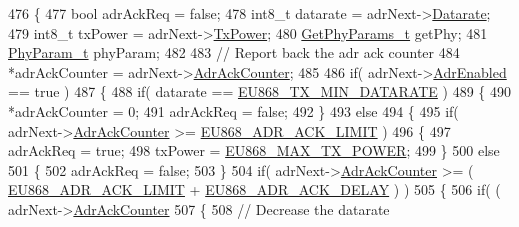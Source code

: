\begin{DoxyCode}
476 \{
477     \textcolor{keywordtype}{bool} adrAckReq = \textcolor{keyword}{false};
478     int8\_t datarate = adrNext->\mbox{\hyperlink{structs_adr_next_params_ae2f6080f3aa0e9485c55513ca56bb24d}{Datarate}};
479     int8\_t txPower = adrNext->\mbox{\hyperlink{structs_adr_next_params_a037b4f849fa8ed4aa1d3c58aef2b28ec}{TxPower}};
480     \mbox{\hyperlink{structs_get_phy_params}{GetPhyParams\_t}} getPhy;
481     \mbox{\hyperlink{unionu_phy_param}{PhyParam\_t}} phyParam;
482 
483     \textcolor{comment}{// Report back the adr ack counter}
484     *adrAckCounter = adrNext->\mbox{\hyperlink{structs_adr_next_params_a24f0356a3491bf07be9ac99ffa33896a}{AdrAckCounter}};
485 
486     \textcolor{keywordflow}{if}( adrNext->\mbox{\hyperlink{structs_adr_next_params_ab3e2fb44577c95786e11aacd56769703}{AdrEnabled}} == \textcolor{keyword}{true} )
487     \{
488         \textcolor{keywordflow}{if}( datarate == \mbox{\hyperlink{group___r_e_g_i_o_n_e_u868_ga2df2a8fc7db7e674c3e58de0dd1c90a4}{EU868\_TX\_MIN\_DATARATE}} )
489         \{
490             *adrAckCounter = 0;
491             adrAckReq = \textcolor{keyword}{false};
492         \}
493         \textcolor{keywordflow}{else}
494         \{
495             \textcolor{keywordflow}{if}( adrNext->\mbox{\hyperlink{structs_adr_next_params_a24f0356a3491bf07be9ac99ffa33896a}{AdrAckCounter}} >= \mbox{\hyperlink{group___r_e_g_i_o_n_e_u868_ga67c54d4a8b30d30138dd013779f72cdf}{EU868\_ADR\_ACK\_LIMIT}} )
496             \{
497                 adrAckReq = \textcolor{keyword}{true};
498                 txPower = \mbox{\hyperlink{group___r_e_g_i_o_n_e_u868_ga39e338c7f8454f594302811f61d9560d}{EU868\_MAX\_TX\_POWER}};
499             \}
500             \textcolor{keywordflow}{else}
501             \{
502                 adrAckReq = \textcolor{keyword}{false};
503             \}
504             \textcolor{keywordflow}{if}( adrNext->\mbox{\hyperlink{structs_adr_next_params_a24f0356a3491bf07be9ac99ffa33896a}{AdrAckCounter}} >= ( \mbox{\hyperlink{group___r_e_g_i_o_n_e_u868_ga67c54d4a8b30d30138dd013779f72cdf}{EU868\_ADR\_ACK\_LIMIT}} + 
      \mbox{\hyperlink{group___r_e_g_i_o_n_e_u868_ga13b5d7d3346971d4dda9919ed73b1394}{EU868\_ADR\_ACK\_DELAY}} ) )
505             \{
506                 \textcolor{keywordflow}{if}( ( adrNext->\mbox{\hyperlink{structs_adr_next_params_a24f0356a3491bf07be9ac99ffa33896a}{AdrAckCounter}} %
507                 \{
508                     \textcolor{comment}{// Decrease the datarate}

\end{DoxyCode}
